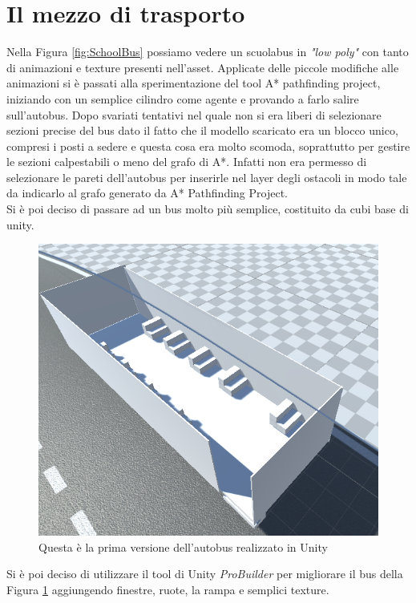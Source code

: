 \documentclass[12pt, openany]{book}
\begin{document}
	\section{Il mezzo di trasporto}
	Nella Figura \ref{fig:SchoolBus} possiamo vedere un scuolabus in \emph{"low poly"} con tanto di animazioni e texture presenti nell'asset. Applicate delle piccole modifiche alle animazioni si è passati alla sperimentazione del tool A* pathfinding project, iniziando con un semplice cilindro come agente e provando a farlo salire sull'autobus. Dopo svariati tentativi nel quale non si era liberi di selezionare sezioni precise del bus dato il fatto che il modello scaricato era un blocco unico, compresi i posti a sedere e questa cosa era molto scomoda, soprattutto per gestire le sezioni calpestabili o meno del grafo di A*. Infatti non era permesso di selezionare le pareti dell'autobus per inserirle nel layer degli ostacoli in modo tale da indicarlo al grafo generato da A* Pathfinding Project.\\
	Si è poi deciso di passare ad un bus molto più semplice, costituito da cubi base di unity.
	\begin{figure}[H]
		\centering
		\includegraphics[width=0.8\linewidth]{"Immagini/AutobusBase.png"}
		\caption{Questa è la prima versione dell'autobus realizzato in Unity}
		\label{fig:AutobusBase}
	\end{figure}
	Si è poi deciso di utilizzare il tool di Unity \emph{ProBuilder} per migliorare il bus della Figura \ref{fig:AutobusBase} aggiungendo finestre, ruote, la rampa e semplici texture.
\end{document}
